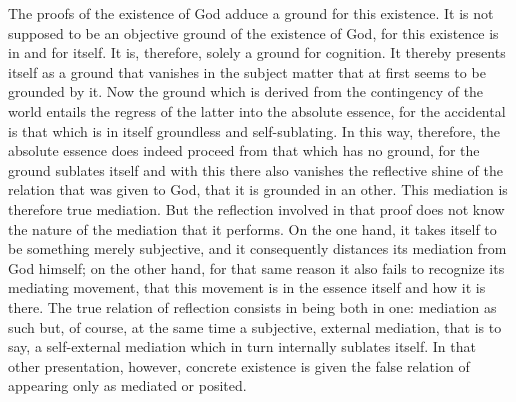 The proofs of the existence of God
adduce a ground for this existence.
It is not supposed to be
an objective ground of the existence of God,
for this existence is in and for itself.
It is, therefore, solely a ground for cognition.
It thereby presents itself as a ground
that vanishes in the subject matter
that at first seems to be grounded by it.
Now the ground which is derived
from the contingency of the world
entails the regress of the latter
into the absolute essence,
for the accidental is that which is
in itself groundless and self-sublating.
In this way, therefore,
the absolute essence does indeed proceed
from that which has no ground,
for the ground sublates itself
and with this there also vanishes
the reflective shine of the relation
that was given to God,
that it is grounded in an other.
This mediation is therefore true mediation.
But the reflection involved
in that proof does not know
the nature of the mediation that it performs.
On the one hand, it takes itself
to be something merely subjective,
and it consequently distances
its mediation from God himself;
on the other hand, for that same reason
it also fails to recognize its mediating movement,
that this movement is in the essence itself
and how it is there.
The true relation of reflection consists
in being both in one:
mediation as such but, of course, at the same time
a subjective, external mediation,
that is to say, a self-external mediation
which in turn internally sublates itself.
In that other presentation, however,
concrete existence is given the false relation
of appearing only as mediated or posited.

